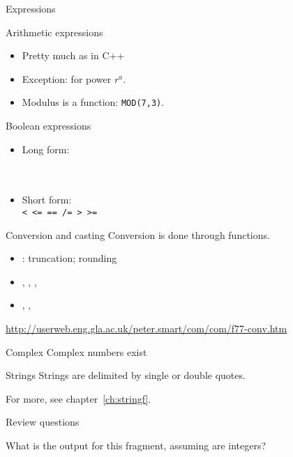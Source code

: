  {Expressions}
\label{sec:fexpr}

\begin{block}{Arithmetic expressions}
  \label{sl:farith}
  \begin{itemize}
  \item Pretty much as in C++
  \item Exception:  for power $r^a$.
  \item Modulus is a function: \lstinline{MOD(7,3)}.
  \end{itemize}
\end{block}

\begin{block}{Boolean expressions}
  \label{sl:fbool}
  \begin{itemize}
  \item 
    Long form:\\
    \\
    \\
  \item Short form:\\
    \verb+< <= == /= > >=+
  \end{itemize}
\end{block}

\begin{block}{Conversion and casting}
  Conversion is done through functions.
  \begin{itemize}
  \item {}: truncation;  rounding
  \item {}, , , 
  \item {}, , 
  \end{itemize}
\url{http://userweb.eng.gla.ac.uk/peter.smart/com/com/f77-conv.htm}
\end{block}

\begin{block}{Complex}
  Complex numbers exist
\end{block}

\begin{block}{Strings}
  Strings are delimited by single or double quotes.

  For more, see chapter~\ref{ch:stringf}.
\end{block}

 {Review questions}

\begin{exercise}
  What is the output for this fragment, assuming  are integers?
\end{exercise}

